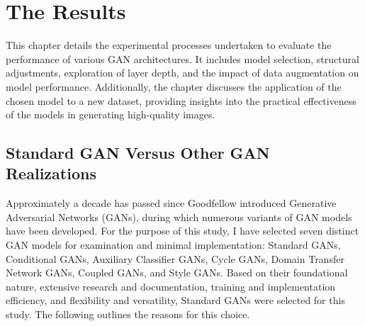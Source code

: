 \chapter{The Results}
\label{Experiments}

This chapter details the experimental processes undertaken to evaluate the performance of various GAN 
architectures. It includes model selection, structural adjustments, exploration of layer depth, and the 
impact of data augmentation on model performance. Additionally, the chapter discusses the application of 
the chosen model to a new dataset, providing insights into the practical effectiveness of the models 
in generating high-quality images. 


\section{Standard GAN Versus Other GAN Realizations}
Approximately a decade has passed since Goodfellow introduced Generative Adversarial Networks (GANs), 
during which numerous variants of GAN models have been developed. For the purpose of this study, 
I have selected seven distinct GAN models for examination and minimal implementation: Standard GANs, 
Conditional GANs, Auxiliary Classifier GANs, Cycle GANs, Domain Transfer Network GANs, Coupled GANs, 
and Style GANs. Based on their foundational nature, extensive research and documentation, training and 
implementation efficiency, and flexibility and versatility, Standard GANs were selected for this study. 
The following outlines the reasons for this choice.


